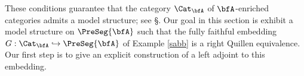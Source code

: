 These conditions guarantee that the category $\Cat_{\bfA}$ of $\bfA$-enriched categories
admits a model structure; see \S {}. Our goal in this section is exhibit
a model structure on $\PreSeg{\bfA}$ such that the fully faithful embedding
$G: \Cat_{\bfA} \hookrightarrow \PreSeg{\bfA}$ of Example \ref{sabb} is a right Quillen equivalence.
Our first step is to give an explicit construction of a left adjoint to this embedding.



